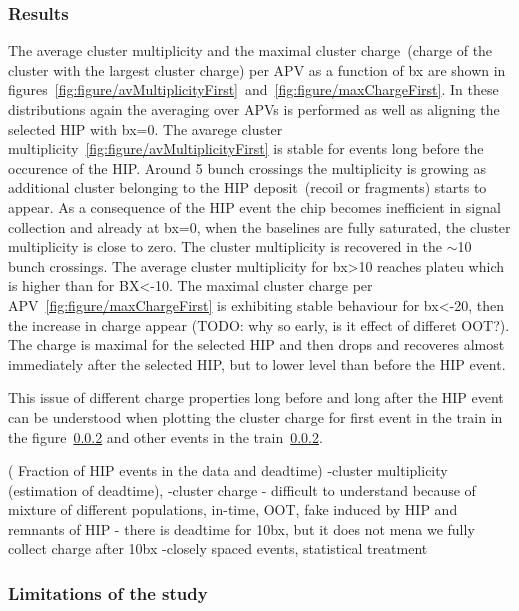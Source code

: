 \subsubsection{Results}

The average cluster multiplicity and the maximal cluster charge~(charge of the cluster with the largest cluster charge) per APV as a function of bx are shown in figures~\ref{fig:figure/avMultiplicityFirst}~and~\ref{fig:figure/maxChargeFirst}. In these distributions again the averaging over APVs is performed as well as aligning the selected HIP with bx=0. The avarege cluster multiplicity~\ref{fig:figure/avMultiplicityFirst} is stable for events long before the occurence of the HIP. Around 5 bunch crossings the multiplicity is growing as additional cluster belonging to the HIP deposit~(recoil or fragments) starts to appear. As a consequence of the HIP event the chip becomes inefficient in signal collection and already at bx=0, when the baselines are fully saturated, the cluster multiplicity is close to zero. The cluster multiplicity is recovered in the $\sim$10 bunch crossings. The average cluster multiplicity for bx>10 reaches plateu which is higher than for BX<-10. The maximal cluster charge per APV~\ref{fig:figure/maxChargeFirst} is exhibiting stable behaviour for bx<-20, then the increase in charge appear (TODO: why so early, is it effect of differet OOT?). The charge is maximal for the selected HIP and then drops and recoveres almost immediately after the selected HIP, but to lower level than before the HIP event. 

This issue of different charge properties long before and long after the HIP event can be understood when plotting the cluster charge for first event in the train in the figure~\ref{} and other events in the train~\ref{}.


     ( Fraction of HIP events in the data and deadtime)     
-cluster multiplicity (estimation of deadtime), 
-cluster charge - difficult to understand because of mixture of different populations, in-time, OOT, fake induced by HIP and remnants of HIP
- there is deadtime for 10bx, but it does not mena we fully collect charge after 10bx
-closely spaced events, statistical treatment

\subsubsection{Limitations of the study}

